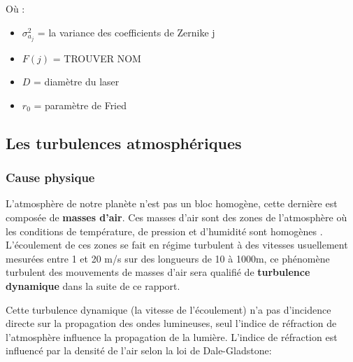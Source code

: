 Où :
\begin{itemize}
  \item $\sigma_{a_j}^2$ = la variance des coefficients de Zernike j
  \item  $F(j)$ = \color{red} TROUVER NOM \color{black}
  \item $D$ = diamètre du laser
  \item $r_0$ = paramètre de Fried
\end{itemize}

\subsection{Les turbulences atmosphériques}

\subsubsection{Cause physique}
L'atmosphère de notre planète n'est pas un bloc homogène, cette dernière est composée de \textbf{masses d'air}. Ces masses d'air
sont des zones de l'atmosphère où les conditions de température, de pression et d'humidité sont homogènes \cite{masse_air_wiki}\cite{masse_air_unige}.
L'écoulement de ces zones se fait en régime turbulent à des vitesses usuellement mesurées entre 1 et 20 m/s sur des longueurs de 10 à 1000m, ce phénomène
turbulent des mouvements de masses d'air sera qualifié de \textbf{turbulence dynamique} dans la suite de ce rapport.

Cette turbulence dynamique (la vitesse de l'écoulement) n'a pas d'incidence directe sur la propagation des ondes lumineuses, seul l'indice de réfraction de l'atmosphère influence la propagation
de la lumière. L'indice de réfraction est influencé par la densité de l'air selon la loi de Dale-Gladstone:



